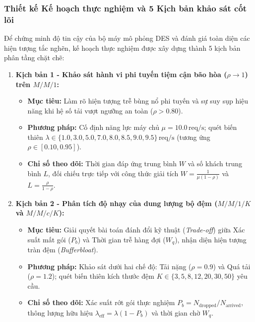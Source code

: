 \subsubsection{Thiết kế Kế hoạch thực nghiệm và 5 Kịch bản khảo sát cốt lõi}
\hspace{0.5cm}Để chứng minh độ tin cậy của bộ máy mô phỏng DES và đánh giá toàn diện các hiện tượng tắc nghẽn, kế hoạch thực nghiệm được xây dựng thành 5 kịch bản phân tầng chặt chẽ:
\begin{enumerate}[leftmargin=1.5em, itemsep=6pt]
    \item \textbf{Kịch bản 1 - Khảo sát hành vi phi tuyến tiệm cận bão hòa ($\rho \to 1$) trên $M/M/1$:}
    \begin{itemize}[leftmargin=1.2em, itemsep=2pt, topsep=2pt]
        \item \textbf{Mục tiêu:} Làm rõ hiện tượng trễ bùng nổ phi tuyến và sự suy sụp hiệu năng khi hệ số tải vượt ngưỡng an toàn ($\rho > 0.80$).
        \item \textbf{Phương pháp:} Cố định năng lực máy chủ $\mu = 10.0\,\text{req/s}$; quét biến thiên \newline $\lambda \in \{1.0, 3.0, 5.0, 7.0, 8.0, 8.5, 9.0, 9.5\}\,\text{req/s}$ (tương ứng $\rho \in [0.10, 0.95]$).
        \item \textbf{Chỉ số theo dõi:} Thời gian đáp ứng trung bình $W$ và số khách trung bình $L$, đối chiếu trực tiếp với công thức giải tích $W = \frac{1}{\mu(1-\rho)}$ và $L = \frac{\rho}{1-\rho}$.
    \end{itemize}

    \item \textbf{Kịch bản 2 - Phân tích độ nhạy của dung lượng bộ đệm ($M/M/1/K$ và $M/M/c/K$):}
    \begin{itemize}[leftmargin=1.2em, itemsep=2pt, topsep=2pt]
        \item \textbf{Mục tiêu:} Giải quyết bài toán đánh đổi kỹ thuật (\textit{Trade-off}) giữa Xác suất mất gói ($P_b$) và Thời gian trễ hàng đợi ($W_q$), nhận diện hiện tượng tràn đệm (\textit{Bufferbloat}).
        \item \textbf{Phương pháp:} Khảo sát dưới hai chế độ: Tải nặng ($\rho = 0.9$) và Quá tải ($\rho = 1.2$); quét biến thiên kích thước đệm $K \in \{3, 5, 8, 12, 20, 30, 50\}$ yêu cầu.
        \item \textbf{Chỉ số theo dõi:} Xác suất rớt gói thực nghiệm $P_b = N_{\text{dropped}} / N_{\text{arrived}}$, thông lượng hữu hiệu $\lambda_{\text{eff}} = \lambda(1 - P_b)$ và thời gian chờ $W_q$.
    \end{itemize}


\end{enumerate}

